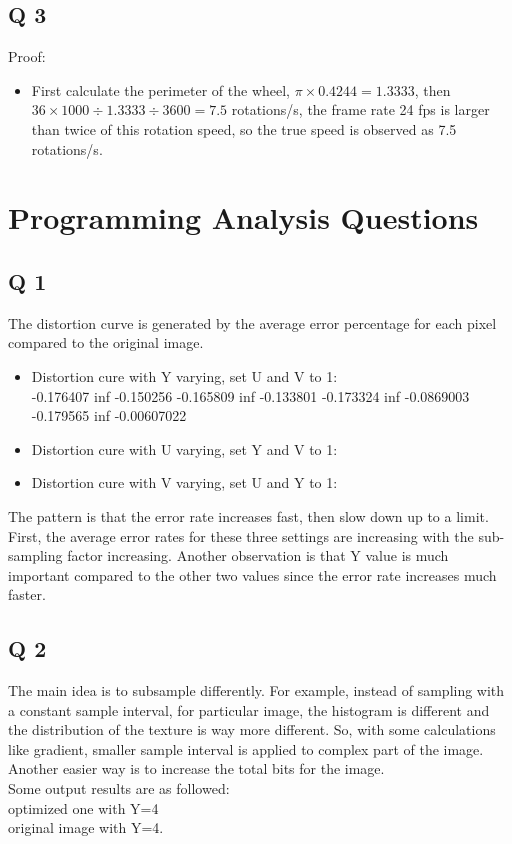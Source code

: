 \documentclass[10pt]{report}            %
\begin{document}
  \section*{Q 3}                  %
  Proof:
  \begin{itemize}
  	\item
  	First calculate the perimeter of the wheel, $\pi\times0.4244 =1.3333$, then $36\times1000\div1.3333\div3600=7.5$ rotations/s, the frame rate 24 fps is larger than twice of this rotation speed, so the true speed is observed as 7.5 rotations/s.

  \end{itemize}
\chapter*{Programming Analysis Questions}
  \section*{Q 1}
  The distortion curve is generated by the average error percentage for each pixel compared to the original image.
  \begin{itemize}
  
  \item
  Distortion cure with Y varying, set U and V to 1:\\
  -0.176407  inf -0.150256
  -0.165809  inf -0.133801
  -0.173324  inf -0.0869003
  -0.179565  inf -0.00607022
  \item
  Distortion cure with U varying, set Y and V to 1:
  \item
  Distortion cure with V varying, set U and Y to 1:
\end{itemize}
	The pattern is that the error rate increases fast, then slow down up to a limit.\\
	First, the average error rates for these three settings are increasing with the sub-sampling factor increasing. Another observation is that Y value is much important compared to the other two values since the error rate increases much faster.\\
  \section*{Q 2}
     The main idea is to subsample differently. For example, instead of sampling with a constant sample interval, for particular image, the histogram is different and the distribution of the texture is  way more different. So, with some calculations like gradient, smaller sample interval is applied to complex part of the image.\\
     Another easier way is to increase the total bits for the image.\\
     Some output results are as followed:\\
     optimized one with Y=4\\
      original image with Y=4.
     
\end{document}
